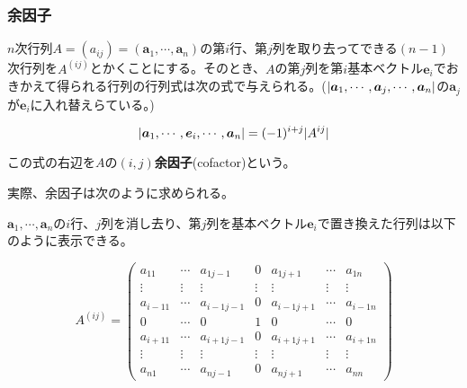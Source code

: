 \documentclass[dvipdfmx,autodetect-engine]{jsarticle}
\theoremstyle{definition}
\DeclarePairedDelimiter{\abs}{\lvert}{\rvert}
\begin{document}


\subsubsection{余因子}

$n$次行列$A = (a_{ij}) = (\bm{a}_1, \cdots, \bm{a}_n)$の第$i$行、第$j$列を取り去ってできる$(n - 1)$次行列を$A^{(ij)}$とかくことにする。そのとき、$A$の第$j$列を第$i$基本ベクトル$\bm{e}_i$でおきかえて得られる行列の行列式は次の式で与えられる。($\abs{\bm{a}_1, \cdots, \bm{a}_j, \cdots, \bm{a}_n}$の$\bm{a}_j$が$\bm{e}_i$に入れ替えらている。)

\begin{equation}
\abs{\bm{a}_1, \cdots, \bm{e}_i, \cdots, \bm{a}_n} = (-1)^{i+j}\abs{A^{ij}}
\label{defi:cofactor}
\end{equation}


この式の右辺を$A$の$(i,j)${\bf 余因子}(cofactor)という。

実際、余因子は次のように求められる。

$\bm{a}_1, \cdots, \bm{a}_n$の$i$行、$j$列を消し去り、第$j$列を基本ベクトル$\bm{e}_i$で置き換えた行列は以下のように表示できる。


$$
A^{(ij)} = \begin{pmatrix*}
a_{11} & \cdots & a_{1{j-1}} & 0 & a_{1{j+1}} & \cdots & a_{1n} \\
\vdots & \vdots & \vdots & \vdots & \vdots & \vdots & \vdots \\
a_{{i-1}1} & \cdots & a_{{i-1}{j-1}} & 0 & a_{{i-1}{j+1}} & \cdots & a_{{i-1}n} \\
0 & \cdots & 0 & 1 & 0 & \cdots & 0 \\
a_{{i+1}1} & \cdots & a_{{i+1}{j-1}} & 0 & a_{{i+1}{j+1}} & \cdots & a_{{i+1}n} \\
\vdots & \vdots & \vdots & \vdots & \vdots & \vdots & \vdots \\
a_{n1} & \cdots & a_{n{j-1}} & 0 & a_{n{j+1}} & \cdots & a_{nn}
\end{pmatrix*}
$$
\end{document}
